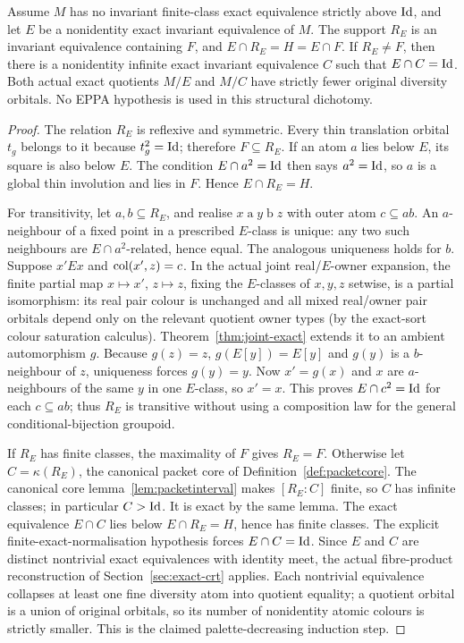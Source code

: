\begin{lemma}
\label{lem:global-correspondence}
Assume $M$ has no invariant finite-class exact equivalence
strictly above $\mathrm{Id}$, and let $E$ be a nonidentity exact
invariant equivalence of $M$.  The support $R_E$ is an invariant equivalence containing $F$,
and $E\cap R_E=H=E\cap F$.  If $R_E\ne F$, then there is a
nonidentity infinite exact invariant equivalence $C$ such that
$E\cap C=\mathrm{Id}$.  Both actual exact quotients $M/E$ and
$M/C$ have strictly fewer original diversity orbitals.
No EPPA hypothesis is used in this structural dichotomy.
\end{lemma}
\begin{proof}
The relation $R_E$ is reflexive and symmetric.  Every thin
translation orbital $t_g$ belongs to it because $t_g^2=\mathrm{Id}$;
therefore $F\subseteq R_E$.  If an atom $a$ lies below $E$,
its square is also below $E$.  The condition
$E\cap a^2=\mathrm{Id}$ then says $a^2=\mathrm{Id}$, so $a$ is a global thin
involution and lies in $F$.  Hence $E\cap R_E=H$.

For transitivity, let $a,b\subseteq R_E$, and realise
$x\mathrel a y\mathrel b z$ with outer atom $c\subseteq ab$.
An $a$-neighbour of a fixed point in a prescribed $E$-class
is unique: any two such neighbours are $E\cap a^2$-related,
hence equal.  The analogous uniqueness holds for $b$.
Suppose $x'Ex$ and $\operatorname{col}(x',z)=c$.  In the actual joint
real/$E$-owner expansion, the finite partial map
$x\mapsto x'$, $z\mapsto z$, fixing the $E$-classes
of $x,y,z$ setwise, is a partial isomorphism: its real
pair colour is unchanged and all mixed real/owner pair
orbitals depend only on the relevant quotient owner types
(by the exact-sort colour saturation calculus).
Theorem~\ref{thm:joint-exact} extends it to an ambient
automorphism $g$.  Because $g(z)=z$, $g(E[y])=E[y]$ and
$g(y)$ is a $b$-neighbour of $z$, uniqueness forces
$g(y)=y$.  Now $x'=g(x)$ and $x$ are $a$-neighbours
of the same $y$ in one $E$-class, so $x'=x$.
This proves $E\cap c^2=\mathrm{Id}$ for each $c\subseteq ab$;
thus $R_E$ is transitive without using a composition
law for the general conditional-bijection groupoid.

If $R_E$ has finite classes, the maximality of $F$ gives
$R_E=F$.  Otherwise let $C=\kappa(R_E)$, the canonical packet
core of Definition~\ref{def:packetcore}.  The canonical core
lemma~\ref{lem:packetinterval} makes $[R_E:C]$ finite, so $C$
has infinite classes; in particular $C>\mathrm{Id}$.  It is exact by
the same lemma.  The exact equivalence $E\cap C$ lies below
$E\cap R_E=H$, hence has finite classes.  The explicit finite-exact-normalisation hypothesis
forces $E\cap C=\mathrm{Id}$.
Since $E$ and $C$ are distinct nontrivial exact
equivalences with identity meet, the actual fibre-product
reconstruction of Section~\ref{sec:exact-crt} applies.  Each nontrivial equivalence collapses at least one
fine diversity atom into quotient equality; a quotient orbital
is a union of original orbitals, so its number of nonidentity
atomic colours is strictly smaller.  This is the claimed
palette-decreasing induction step.
\end{proof}

